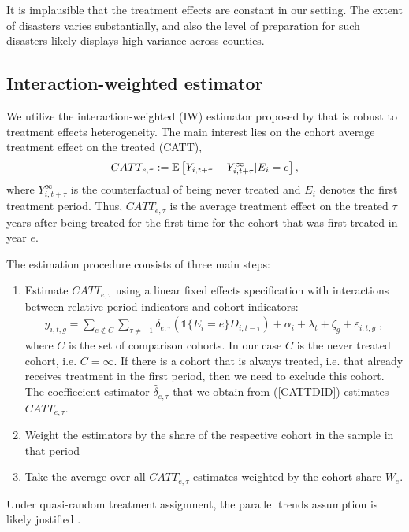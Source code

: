 It is implausible that the treatment effects are constant in our setting. The extent of disasters varies substantially, and also the level of preparation for such disasters likely displays high variance across counties. 

\subsection{Interaction-weighted estimator}

We utilize the interaction-weighted (IW) estimator proposed by \cite{Sun_2021} that is robust to treatment effects heterogeneity. The main interest lies on the cohort average treatment effect on the treated (CATT),
\begin{align*}
	CATT_{e, \tau} := \mathbb{E} \left[ Y_{i, t+\tau} - Y_{i, t+\tau}^{\infty} | E_i = e \right],
\end{align*}
where $Y_{i, t+\tau}^{\infty}$ is the counterfactual of being never treated and $E_i$ denotes the first treatment period. Thus, $CATT_{e, \tau}$ is the average treatment effect on the treated $\tau$ years after being treated for the first time for the cohort that was first treated in year $e$.

The estimation procedure consists of three main steps:
\begin{enumerate}
	\item Estimate $CATT_{e, \tau}$ using a linear fixed effects specification with interactions between relative period indicators and cohort indicators:
	\begin{align} \label{CATTDID}
		y_{i, t, g} = \sum_{e \notin C}^{}\sum_{\tau \neq -1}^{} \delta_{e, \tau} (\mathds{1}\{E_i = e\} D_{i, t-\tau}) + \alpha_i + \lambda_t + \zeta_g + \varepsilon_{i, t, g} \;,
	\end{align}
	where $C$ is the set of comparison cohorts. In our case $C$ is the never treated cohort, i.e. $C = {\infty}$. If there is a cohort that is always treated, i.e. that already receives treatment in the first period, then we need to exclude this cohort. The coeffiecient estimator $\widehat{\delta}_{e, \tau}$ that we obtain from (\ref{CATTDID}) estimates $CATT_{e, \tau}$.
	
	\item Weight the estimators by the share of the respective cohort in the sample in that period
	
	\item Take the average over all $CATT_{e, \tau}$ estimates weighted by the cohort share $W_e$.
\end{enumerate}




Under quasi-random treatment assignment, the parallel trends assumption is likely justified \citep{Roth_2022}. 




